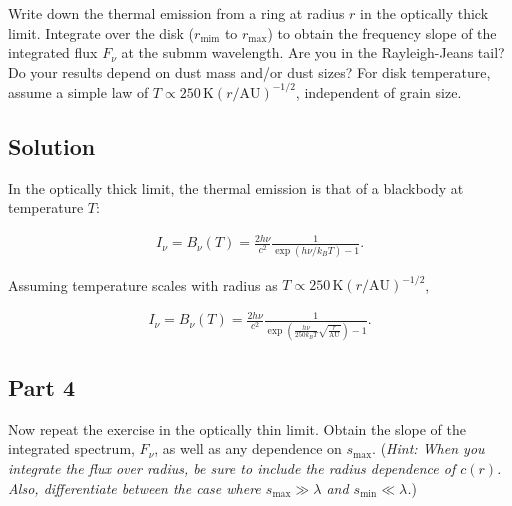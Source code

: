\documentclass[12pt]{article}
\begin{document}
Write down the thermal emission from a ring at radius $r$ in the optically thick limit. Integrate over the disk ($r_\mathrm{mim}$ to $r_\mathrm{max}$) to obtain the frequency slope of the integrated flux $F_\nu$ at the submm wavelength. Are you in the Rayleigh-Jeans tail? Do your results depend on dust mass and/or dust sizes? For disk temperature, assume a simple law of $T\propto250\,\mathrm{K}(r/\mathrm{AU})^{-1/2}$, independent of grain size.


\subsection*{Solution}

In the optically thick limit, the thermal emission is that of a blackbody at temperature $T$:

\begin{align*}
I_\nu = B_\nu(T) = \frac{2h\nu}{c^2} \frac{1}{\exp(h\nu/k_BT) -1}.
\end{align*}

Assuming temperature scales with radius as $T \propto 250\,\mathrm{K}(r/\mathrm{AU})^{-1/2}$,

\begin{align*}
I_\nu = B_\nu(T) = \frac{2h\nu}{c^2} \frac{1}{\exp\left(\frac{h\nu}{250k_BT}\sqrt{\frac{r}{\mathrm{AU}}}\right) -1}.
\end{align*}


\subsection*{Part 4}

Now repeat the exercise in the optically thin limit. Obtain the slope of the integrated spectrum, $F_\nu$, as well as any dependence on $s_\mathrm{max}$. (\textit{Hint: When you integrate the flux over radius, be sure to include the radius dependence of $c(r)$. Also, differentiate between the case where $s_\mathrm{max} \gg \lambda$ and $s_\mathrm{min} \ll \lambda$.})

\end{document}
